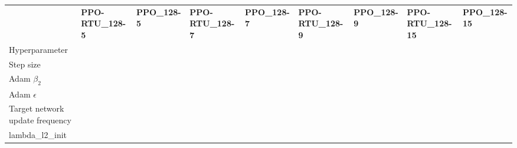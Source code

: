 \begin{tabular}{lllllllll}
 & \bfseries PPO-RTU_128-5 & \bfseries PPO_128-5 & \bfseries PPO-RTU_128-7 & \bfseries PPO_128-7 & \bfseries PPO-RTU_128-9 & \bfseries PPO_128-9 & \bfseries PPO-RTU_128-15 & \bfseries PPO_128-15 \\
Hyperparameter &  &  &  &  &  &  &  &  \\
Step size &  &  &  &  &  &  &  &  \\
Adam $\beta_2$ &  &  &  &  &  &  &  &  \\
Adam $\epsilon$ &  &  &  &  &  &  &  &  \\
Target network update frequency &  &  &  &  &  &  &  &  \\
lambda_l2_init &  &  &  &  &  &  &  &  \\
\end{tabular}
